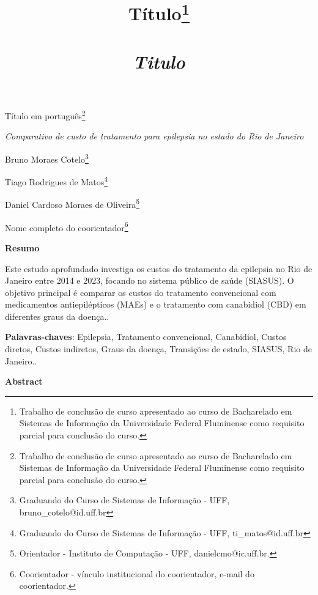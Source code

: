 \documentclass[article,a4paper,12pt,brazil,sumario=tradicional]{abntex2}
\title{ {\Large Título\footnote{Trabalho de conclusão de curso apresentado ao curso de Bacharelado em Sistemas de Informação da Universidade Federal Fluminense como requisito parcial para conclusão do curso.}\\\\
\vspace{.2} 
\textit{Titulo}\\}}
\date{ }
\begin{document}
\textual

\begin{center}
{\Large Título em português\footnote{Trabalho de conclusão de curso apresentado ao curso de Bacharelado em Sistemas de Informação da Universidade Federal Fluminense como requisito parcial para conclusão do curso.}

\textit{Comparativo de custo de tratamento para epilepsia no estado do Rio de Janeiro}\\}
\end{center}
\vspace{.2cm} 

\begin{flushright}
Bruno Moraes Cotelo\footnote{Graduando do Curso de Sistemas de Informação - UFF, bruno\_cotelo@id.uff.br}

Tiago Rodrigues de Matos\footnote{Graduando do Curso de Sistemas de Informação - UFF, ti\_matos@id.uff.br}

Daniel Cardoso Moraes de Oliveira\footnote{Orientador - Instituto de Computação - UFF, danielcmo@ic.uff.br.} 

Nome completo do coorientador\footnote{Coorientador - vínculo institucional do coorientador, e-mail do coorientador.}
\end{flushright}

\vspace{\onelineskip}

\begin{center}
    \textbf{Resumo}
\end{center}

\vspace{-.3cm}

\noindent Este estudo aprofundado investiga os custos do tratamento da epilepsia no Rio de Janeiro entre 2014 e 2023, focando no sistema público de saúde (SIASUS). O objetivo principal é comparar os custos do tratamento convencional com medicamentos antiepilépticos (MAEs) e o tratamento com canabidiol (CBD) em diferentes graus da doença..

\vspace{.4cm}
 
\noindent
\textbf{Palavras-chaves}: Epilepsia, Tratamento convencional, Canabidiol, Custos diretos, Custos indiretos, Graus da doença, Transições de estado, SIASUS, Rio de Janeiro.. 
 
\vspace{\onelineskip}

\begin{center}
    \textbf{Abstract}
\end{center}
\end{document}

